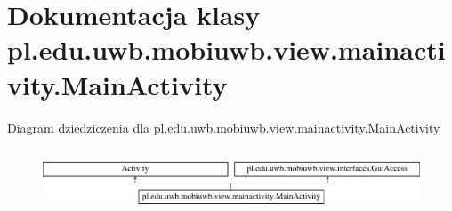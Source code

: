 \hypertarget{classpl_1_1edu_1_1uwb_1_1mobiuwb_1_1view_1_1mainactivity_1_1_main_activity}{}\section{Dokumentacja klasy pl.\+edu.\+uwb.\+mobiuwb.\+view.\+mainactivity.\+Main\+Activity}
\label{classpl_1_1edu_1_1uwb_1_1mobiuwb_1_1view_1_1mainactivity_1_1_main_activity}
Diagram dziedziczenia dla pl.\+edu.\+uwb.\+mobiuwb.\+view.\+mainactivity.\+Main\+Activity\begin{figure}[H]
\begin{center}
\leavevmode
\includegraphics[height=1.812298cm]{classpl_1_1edu_1_1uwb_1_1mobiuwb_1_1view_1_1mainactivity_1_1_main_activity}
\end{center}
\end{figure}
